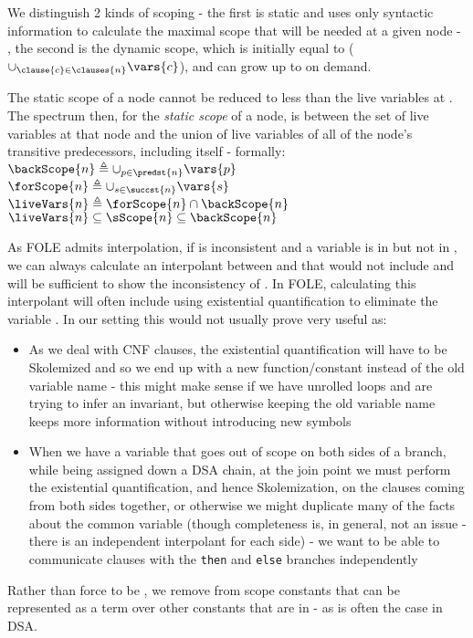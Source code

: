 We distinguish 2 kinds of scoping - the first is static and uses only syntactic information to calculate the maximal scope that will be needed at a given node - , the second is the dynamic scope, which is initially equal to  ($\cup_{\clause{c} \in \clauses{n}} \vars{c}$), and can grow up to  on demand.

The static scope of a node  cannot be reduced to less than the live variables at .
The spectrum then, for the \emph{static scope} of a node, is between the set of live variables at that node and the union of live variables of all of the node's transitive predecessors, including itself - formally:\\
$\backScope{n} \triangleq \cup_{p \in \predst{n}} \vars{p}$ \\
$\forScope{n} \triangleq \cup_{s \in \succst{n}} \vars{s}$ \\
$\liveVars{n} \triangleq \forScope{n} \cap \backScope{n}$ \\
$\liveVars{n} \subseteq \sScope{n} \subseteq \backScope{n}$

As FOLE admits interpolation, if  is inconsistent and a variable  is in  but not in , we can always calculate an interpolant between  and   that would not include  and will be sufficient to show the inconsistency of .
In FOLE, calculating this interpolant will often include using existential quantification to eliminate the variable .
In our setting this would not usually prove very useful as:
\begin{itemize}
	\item As we deal with CNF clauses, the existential quantification will have to be Skolemized and so we end up with a new function/constant instead of the old variable name - this might make sense if we have unrolled loops and are trying to infer an invariant, but otherwise keeping the old variable name keeps more information without introducing new symbols
	\item When we have a variable that goes out of scope on both sides of a branch, while being assigned down a DSA chain, at the join point we must perform the existential quantification, and hence Skolemization, on the clauses coming from both sides together, or otherwise we might duplicate many of the facts about the common variable (though completeness is, in general, not an issue - there is an independent interpolant for each side) - we want to be able to communicate clauses with the \lstinline{then} and \lstinline{else} branches independently
\end{itemize}

Rather than force  to be , we remove from scope constants that can be represented as a term over other constants that are in  - as is often the case in DSA.
